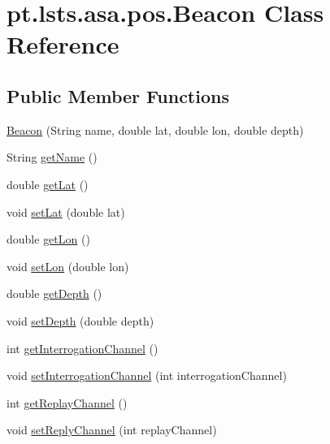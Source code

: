 \hypertarget{classpt_1_1lsts_1_1asa_1_1pos_1_1Beacon}{}\section{pt.\+lsts.\+asa.\+pos.\+Beacon Class Reference}
\label{classpt_1_1lsts_1_1asa_1_1pos_1_1Beacon}
\subsection*{Public Member Functions}
\begin{DoxyCompactItemize}
\item 
\hyperlink{classpt_1_1lsts_1_1asa_1_1pos_1_1Beacon_a0f03ddf5addca9d0f4822696ad27a912}{Beacon} (String name, double lat, double lon, double depth)
\item 
String \hyperlink{classpt_1_1lsts_1_1asa_1_1pos_1_1Beacon_ad5013fdab76b106ca3dd51bb7c6f54c1}{get\+Name} ()
\item 
double \hyperlink{classpt_1_1lsts_1_1asa_1_1pos_1_1Beacon_aa32af015c3a2e2114e32c0a462d6637a}{get\+Lat} ()
\item 
void \hyperlink{classpt_1_1lsts_1_1asa_1_1pos_1_1Beacon_a2d7d5505d9ac7a02814862ad20702c75}{set\+Lat} (double lat)
\item 
double \hyperlink{classpt_1_1lsts_1_1asa_1_1pos_1_1Beacon_aba2d43d83ccf43aab9b7d1dd73dbf93e}{get\+Lon} ()
\item 
void \hyperlink{classpt_1_1lsts_1_1asa_1_1pos_1_1Beacon_a6371fdfa4370985a0e2125ac66c36726}{set\+Lon} (double lon)
\item 
double \hyperlink{classpt_1_1lsts_1_1asa_1_1pos_1_1Beacon_afb8f5df5a046d758e9dce2803e9baa21}{get\+Depth} ()
\item 
void \hyperlink{classpt_1_1lsts_1_1asa_1_1pos_1_1Beacon_a253dfef86f9eca5a48622c9150e00cc3}{set\+Depth} (double depth)
\item 
int \hyperlink{classpt_1_1lsts_1_1asa_1_1pos_1_1Beacon_ab255c1aae95840cc8b819e06b1925eba}{get\+Interrogation\+Channel} ()
\item 
void \hyperlink{classpt_1_1lsts_1_1asa_1_1pos_1_1Beacon_ac736b6771bc172306bb36acf189f8ac0}{set\+Interrogation\+Channel} (int interrogation\+Channel)
\item 
int \hyperlink{classpt_1_1lsts_1_1asa_1_1pos_1_1Beacon_a7c9392b6ae79ce6870c4502cd388b388}{get\+Replay\+Channel} ()
\item 
void \hyperlink{classpt_1_1lsts_1_1asa_1_1pos_1_1Beacon_a476bf87444463dc26b0ea8b1877e3ff9}{set\+Reply\+Channel} (int replay\+Channel)

\end{DoxyCompactItemize}
